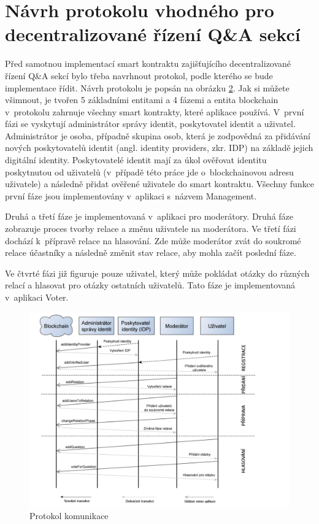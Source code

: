 \begin{figure}
\begin{minipage}{.5\textwidth}
  \label{fig:navrh2}
\end{minipage}
\end{figure}

\section{Návrh protokolu vhodného pro decentralizované řízení Q\&A sekcí}
\label{protokol}
Před samotnou implementací smart kontraktu zajišťujícího decentralizované řízení Q\&A sekcí bylo třeba navrhnout protokol, podle kterého se bude implementace řídit. Návrh protokolu je popsán na obrázku \ref{fig:protokol}. Jak si můžete všimnout, je tvořen 5 základními entitami a 4 fázemi a entita blockchain v~protokolu zahrnuje všechny smart kontrakty, které aplikace používá. 
V~první fázi se vyskytují administrátor správy identit, poskytovatel identit a uživatel. Administrátor je osoba, případně skupina osob, která je zodpovědná za přidávání nových poskytovatelů identit (angl. identity providers, zkr. IDP) na základě jejich digitální identity. Poskytovatelé identit mají za úkol ověřovat identitu poskytnutou od uživatelů (v~případě této práce jde o~blockchainovou adresu uživatele) a následně přidat ověřené uživatele do smart kontraktu. Všechny funkce první fáze jsou implementovány v~aplikaci s~názvem Management.  

Druhá a třetí fáze je implementovaná v~aplikaci pro moderátory. Druhá fáze zobrazuje proces tvorby relace a změnu uživatele na moderátora. Ve třetí fázi dochází k~přípravě relace na hlasování. Zde může moderátor zvát do soukromé relace účastníky a následně změnit stav relace, aby mohla začít poslední fáze. 

Ve čtvrté fázi již figuruje pouze uživatel, který může pokládat otázky do různých relací a hlasovat pro otázky ostatních uživatelů. Tato fáze je implementovaná v~aplikaci Voter.

\begin{figure}
\centering
\includegraphics[width=\linewidth]{obrazky/protokol_sipky.png}
\caption{Protokol komunikace}
\label{fig:protokol}
\end{figure}
